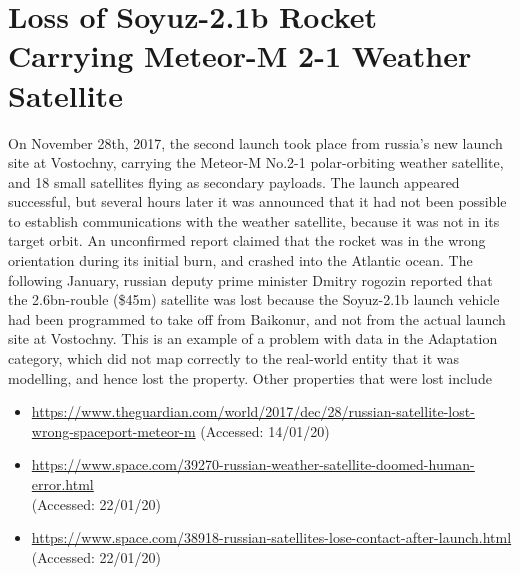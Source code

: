%
%
\section{Loss of Soyuz-2.1b Rocket Carrying Meteor-M 2-1 Weather Satellite} \label{bkm:incacc:soyuz}
On November 28th, 2017, the second launch took place from russia's new launch site at Vostochny, carrying the Meteor-M No.2-1 polar-orbiting weather satellite, and 18 small satellites flying as secondary payloads. The launch appeared successful, but several hours later it was announced that it had not been possible to establish communications with the weather satellite, because it was not in its target orbit. An unconfirmed report claimed that the rocket was in the wrong orientation during its initial burn, and crashed into the Atlantic ocean.
The following January, russian deputy prime minister Dmitry rogozin reported that the 2.6bn-rouble (\$45m) satellite was lost because the Soyuz-2.1b launch vehicle had been programmed to take off from Baikonur, and not from the actual launch site at Vostochny. 
This is an example of a problem with data in the Adaptation category, which did not map correctly to the real-world entity that it was modelling, and hence lost the  property. Other properties that were lost include 

\begin{itemize}
  \item \raggedright{\href{https://www.theguardian.com/world/2017/dec/28/russian-satellite-lost-wrong-spaceport-meteor-m}{https://www.theguardian.com/world/2017/dec/28/russian-satellite-lost-wrong-spaceport-meteor-m} (Accessed: 14/01/20)}
  \item \raggedright{\href{https://www.space.com/39270-russian-weather-satellite-doomed-human-error.html}{https://www.space.com/39270-russian-weather-satellite-doomed-human-error.html} \\(Accessed: 22/01/20)}
  \item \raggedright{\href{https://www.space.com/38918-russian-satellites-lose-contact-after-launch.html}{https://www.space.com/38918-russian-satellites-lose-contact-after-launch.html} \\(Accessed: 22/01/20)}
\end{itemize}
%
%
